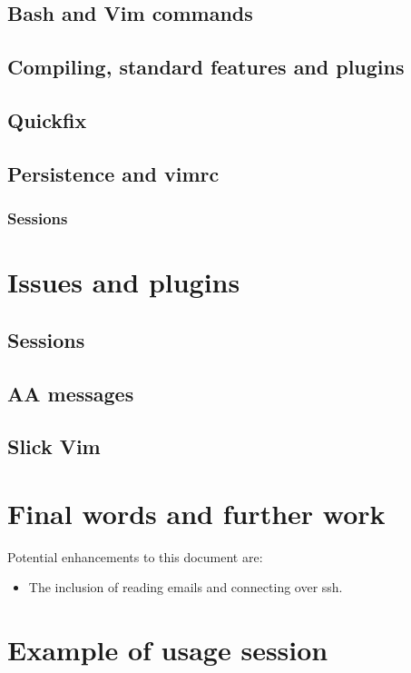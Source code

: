 \documentclass{article}
\begin{document}
\subsection{Bash and Vim commands}
\subsection{Compiling, standard features and plugins}
\subsection{Quickfix}
\subsection{Persistence and vimrc}
\subsubsection{Sessions}\label{sessions}
\section{Issues and plugins}\label{issues}
\subsection{Sessions}
\subsection{AA messages}
\subsection{Slick Vim}

\section{Final words and further work}

Potential enhancements to this document are:
\begin{itemize}
  \item The inclusion of reading emails and connecting over ssh.
\end{itemize}

\appendix
\section{Example of usage session}
\end{document}
